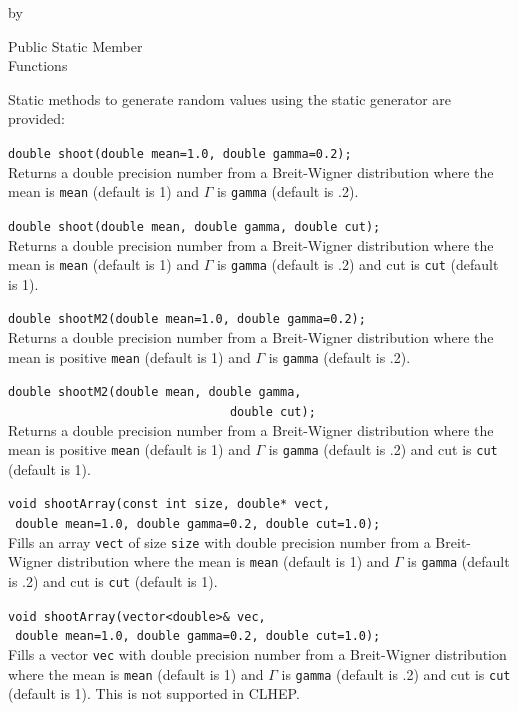 \documentclass[twoside]{article}
\newcommand{\comp}[1]{\texttt{#1}}%
\newcommand{\entrylabel}[1]{\mbox{\textbf{{#1}}}\hfil}%
\newenvironment{entry}
{\begin{list}{}%
    {\renewcommand{\makelabel}{\entrylabel}%
     \setlength{\labelwidth}{90pt}%
     \setlength{\leftmargin}{\labelwidth}
     \advance\leftmargin by \labelsep%
      }%
    }%
  {\end{list}}
\newcommand{\Entrylabel}[1]%
{\raisebox{0pt}[1ex][0pt]{\makebox[\labelwidth][l]%
    {\parbox[t]{\labelwidth}{\hspace{0pt}\textbf{{#1}}}}}}
\newenvironment{Entry}%
{\renewcommand{\entrylabel}{\Entrylabel}\begin{entry}}%
  {\end{entry}}
\begin{document}
\begin{Entry}
\item[Public Static Member\\ Functions]
  
    Static methods to generate random values using the static generator
    are provided:

    \verb+double shoot(double mean=1.0, double gamma=0.2);+\\
    Returns a double precision number from a Breit-Wigner
    distribution where the mean is \comp{mean} (default is 1)
    and $\Gamma$ is \comp{gamma} (default is .2).
    
    \verb+double shoot(double mean, double gamma, double cut);+\\
    Returns a double precision number from a Breit-Wigner
    distribution where the mean is \comp{mean} (default is 1)
    and $\Gamma$ is \comp{gamma} (default is .2) and cut is
    \comp{cut} (default is 1).
    
    \verb+double shootM2(double mean=1.0, double gamma=0.2);+\\
    Returns a double precision number from a Breit-Wigner
    distribution where the mean is positive \comp{mean} (default is 1)
    and $\Gamma$ is \comp{gamma} (default is .2).
    
    \verb+double shootM2(double mean, double gamma,+\\
    \verb+                               double cut);+\\
    Returns a double precision number from a Breit-Wigner
    distribution where the mean is positive \comp{mean} (default is 1)
    and $\Gamma$ is \comp{gamma} (default is .2) and cut is
    \comp{cut} (default is 1).
    
    \verb+void shootArray(const int size, double* vect,+\\
    \verb+ double mean=1.0, double gamma=0.2, double cut=1.0);+\\
    Fills an array \comp{vect} of size \comp{size} with double
    precision number from a Breit-Wigner
    distribution where the mean is \comp{mean} (default is 1)
    and $\Gamma$ is \comp{gamma} (default is .2) and cut is
    \comp{cut} (default is 1).

    \verb+void shootArray(vector<double>& vec,+\\
    \verb+ double mean=1.0, double gamma=0.2, double cut=1.0);+\\
    Fills a vector \comp{vec} with double
    precision number from a Breit-Wigner
    distribution where the mean is \comp{mean} (default is 1)
    and $\Gamma$ is \comp{gamma} (default is .2) and cut is
    \comp{cut} (default is 1).  This is not supported in CLHEP.
    

\end{Entry}
\end{document}
